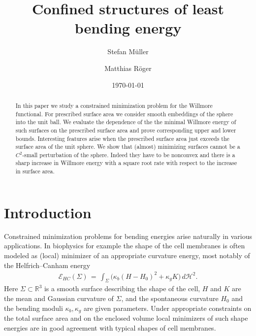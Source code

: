 \documentclass[reqno,makeidx,12pt]{amsart}
\theoremstyle{note}
\theoremstyle{definition}
\begin{document}
\title{Confined structures of least bending energy}
\author{Stefan M\"uller}
\address{Stefan M\"uller,  Institute for Applied Mathematics and Hausdorff Center for Mathematics, University of Bonn, Endenicher Alllee 60, D-53115 Bonn, Germany}

\author{Matthias R{\"o}ger}
\address{Matthias R{\"o}ger, Technische Universit\"at Dortmund,
Fakult\"at fÃ¼r Mathematik,
Vogelpothsweg 87,
D-44227 Dortmund}


\keywords{}

\date{\today}

\begin{abstract}
In this paper we study a constrained minimization problem for the Willmore functional. For prescribed surface area we consider smooth embeddings of the sphere into the unit ball. We evaluate the dependence of the  the minimal Willmore energy of such surfaces on the prescribed surface area and prove corresponding upper and lower bounds. Interesting features arise when the prescribed surface area just exceeds the surface area of the unit sphere. We show that (almost) minimizing surfaces cannot be a $C^2$-small perturbation of the sphere. Indeed they have to be nonconvex and there is a sharp increase in Willmore energy with a square root rate with respect to the increase in surface area.
\end{abstract}
\maketitle
\section{Introduction}
\label{sec:intro}
Constrained minimization problems for bending energies arise naturally in various applications. In biophysics for example the shape of the cell membranes is often modeled as (local) minimizer of an appropriate curvature energy, most notably of the Helfrich--Canham energy
\begin{gather*}
	{\ensuremath{\mathcal{E}}}_{HC}(\Sigma)\,=\, \int_\Sigma \big(\kappa_b (H-H_0)^2 +\kappa_g K\big)\,d{\ensuremath{\mathcal{H}}}^2.
\end{gather*}
Here $\Sigma\subset{\mathbb R}^3$ is a smooth surface describing the shape of the cell, $H$ and $K$ are the mean and Gaussian curvature of $\Sigma$, and the spontaneous curvature $H_0$ and the bending moduli $\kappa_b,\kappa_g$ are given parameters. Under appropriate constraints on the total surface area and on the enclosed volume local minimizers of such shape energies are in good agreement with typical shapes of cell membranes.
\end{document}
